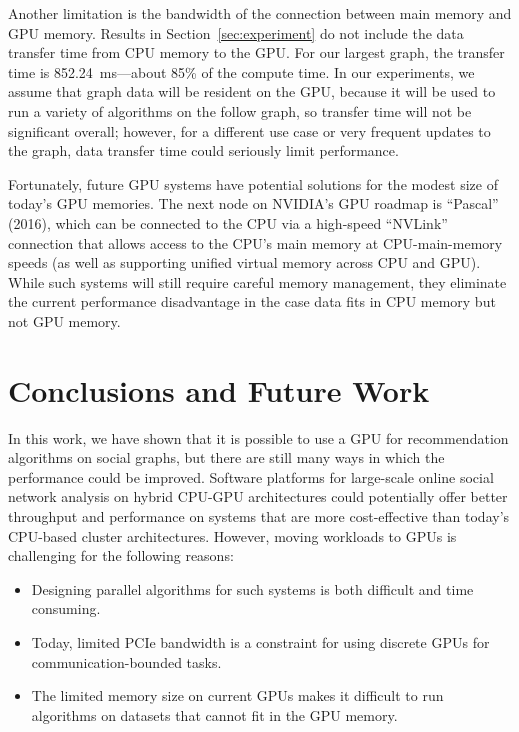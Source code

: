 \documentclass{article}
\begin{document}
Another limitation is the bandwidth of the connection between main memory
and GPU memory. Results in Section~\ref{sec:experiment} do not include the
data transfer time from CPU memory to the GPU\@. For our largest graph, the
transfer time is 852.24~ms---about 85\% of the compute time. In our
experiments, we assume that graph data will be resident on the GPU, because
it will be used to run a variety of algorithms on the follow graph, so
transfer time will not be significant overall; however, for a different use
case or very frequent updates to the graph, data transfer time could
seriously limit performance.

Fortunately, future GPU systems have potential solutions for the modest
size of today's GPU memories. The next node on NVIDIA's GPU roadmap is
``Pascal'' (2016), which can be connected to the CPU via a high-speed
``NVLink'' connection that allows access to the CPU's main memory at
CPU-main-memory speeds (as well as supporting unified virtual memory across
CPU and GPU\@). While such systems will still require careful memory
management, they eliminate the current performance disadvantage in the case
data fits in CPU memory but not GPU memory.

\section{Conclusions and Future Work} In this work, we have shown that it is possible to use a GPU for
recommendation algorithms on social graphs, but there are still many ways
in which the performance could be improved. Software platforms for
large-scale online social network analysis on hybrid CPU-GPU architectures
could potentially offer better throughput and performance on systems that
are more cost-effective than today's CPU-based cluster architectures.
However, moving workloads to GPUs is challenging for the following reasons:

\begin{itemize}
  \item Designing parallel algorithms for such systems is both difficult and time
        consuming.
  \item Today, limited PCIe bandwidth is a constraint for using discrete GPUs for
        communication-bounded tasks.
  \item The limited memory size on current GPUs makes it difficult to run
        algorithms on datasets that cannot fit in the GPU memory.
\end{itemize}
\end{document}
